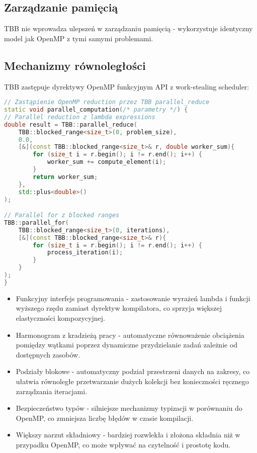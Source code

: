 \subsection{Zarządzanie pamięcią}
TBB nie wprowadza ulepszeń w zarządzaniu pamięcią - wykorzystuje identyczny model jak OpenMP z tymi samymi problemami.

\subsection{Mechanizmy równoległości}
TBB zastępuje dyrektywy OpenMP funkcyjnym API z work-stealing scheduler:
\begin{lstlisting}[language=C++, caption={Implementacja TBB - równoległość}, label={lst:TBB-parallelism}]
// Zastąpienie OpenMP reduction przez TBB parallel_reduce
static void parallel_computation(/* parametry */) {
// Parallel reduction z lambda expressions
double result = TBB::parallel_reduce(
    TBB::blocked_range<size_t>(0, problem_size), 
    0.0, 
    [&](const TBB::blocked_range<size_t>& r, double worker_sum){
        for (size_t i = r.begin(); i != r.end(); i++) {
            worker_sum += compute_element(i);
        }
        return worker_sum;
    }, 
    std::plus<double>()
);

// Parallel for z blocked ranges
TBB::parallel_for(
    TBB::blocked_range<size_t>(0, iterations), 
    [&](const TBB::blocked_range<size_t>& r){
        for (size_t i = r.begin(); i != r.end(); i++) {
            process_iteration(i);
        }
    }
);
}
\end{lstlisting}
\begin{itemize}
    \item Funkcyjny interfejs programowania - zastosowanie wyrażeń lambda i funkcji wyższego rzędu zamiast dyrektyw kompilatora, co sprzyja większej elastyczności kompozycyjnej.
    
    \item Harmonogram z kradzieżą pracy  - automatyczne równoważenie obciążenia pomiędzy wątkami poprzez dynamiczne przydzielanie zadań zależnie od dostępnych zasobów.
    
    \item Podziały blokowe - automatyczny podział przestrzeni danych na zakresy, co ułatwia równoległe przetwarzanie dużych kolekcji bez konieczności ręcznego zarządzania iteracjami.
    
    \item Bezpieczeństwo typów - silniejsze mechanizmy typizacji w porównaniu do OpenMP, co zmniejsza liczbę błędów w czasie kompilacji.
    
    \item Większy narzut składniowy - bardziej rozwlekła i złożona składnia niż w przypadku OpenMP, co może wpływać na czytelność i prostotę kodu.
\end{itemize}

